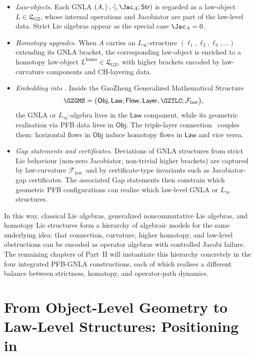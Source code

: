 \documentclass[11pt]{book}
\theoremstyle{plain}
\theoremstyle{definition}
\newcommand{\GFramework}{\text{G-Framework}} \newcommand{\GAlgebra}{\text{G-Algebra}}
\newcommand{\GZLS}{\ensuremath{\mathfrak{L}_{\mathrm{GZ}}}}       \newcommand{\GZLT}{\ensuremath{M_{!w}}}                           \newcommand{\GZLOC}{\ensuremath{A_M}}                             \newcommand{\GZLCurv}{\ensuremath{\mathcal{F}_{\mathrm{law}}}}
\begin{document}
\begin{itemize}
  \item \emph{Law-objects.}
        Each GNLA $(A,[\cdot,\cdot],\Jac_A;\mathsf{Str})$ is regarded
        as a law-object $L\in\GZLS$, whose internal operations and
        Jacobiator are part of the law-level data. Strict Lie algebras
        appear as the special case $\Jac_A=0$.
  \item \emph{Homotopy upgrades.}
        When $A$ carries an $L_\infty$-structure
        $(\ell_1,\ell_2,\ell_3,\dots)$ extending its GNLA bracket,
        the corresponding law-object is enriched to a homotopy
        law-object $L^{\mathrm{homo}}\in\GZLS$, with higher brackets
        encoded by law-curvature components and CH-layering data.
  \item \emph{Embedding into \GZGMS.}
        Inside the GaoZheng Generalized Mathematical Structure
        \[
           \GZGMS =
           \bigl(\mathsf{Obj},\mathsf{Law},\mathsf{Flow},\mathsf{Layer},
                 \GZTLC;\GZLCurv\bigr),
        \]
        the GNLA or $L_\infty$-algebra lives in the $\mathsf{Law}$
        component, while its geometric realisation via PFB data lives
        in $\mathsf{Obj}$. The triple-layer connection \GZTLC\ couples
        them: horizontal flows in $\mathsf{Obj}$ induce homotopy
        flows in $\mathsf{Law}$ and vice versa.
  \item \emph{Gap statements and certificates.}
        Deviations of GNLA structures from strict Lie behaviour
        (non-zero Jacobiator, non-trivial higher brackets) are captured
        by law-curvature \GZLCurv\ and by certificate-type invariants
        such as Jacobiator-gap certificates. The associated Gap
        statements then constrain which geometric PFB configurations
        can realise which law-level GNLA or $L_\infty$ structures.
\end{itemize}

In this way, classical Lie algebras, generalized noncommutative Lie
algebras, and homotopy Lie structures form a hierarchy of algebraic
models for the same underlying idea: that connection, curvature,
higher homotopy, and law-level obstructions can be encoded as operator
algebras with controlled Jacobi failure. The remaining chapters of
Part~II will instantiate this hierarchy concretely in the four
integrated PFB-GNLA constructions, each of which realises a different
balance between strictness, homotopy, and operator-path dynamics.



\section{From Object-Level Geometry to Law-Level Structures: Positioning \GAlgebra in \GFramework}
\end{document}
